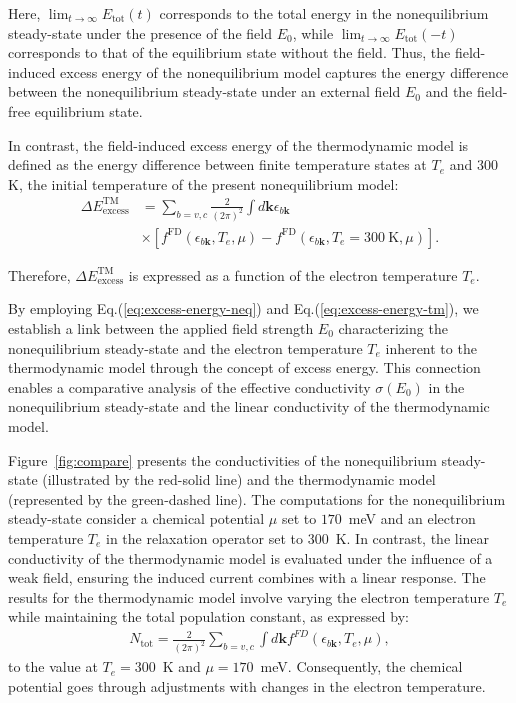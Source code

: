 Here, $\lim_{t\rightarrow \infty} E_{\mathrm{tot}}(t)$ corresponds to the total energy in the nonequilibrium steady-state under the presence of the field $E_0$, while $\lim_{t\rightarrow \infty} E_{\mathrm{tot}}(-t)$ corresponds to that of the equilibrium state without the field. Thus, the field-induced excess energy of the nonequilibrium model captures the energy difference between the nonequilibrium steady-state under an external field $E_0$ and the field-free equilibrium state.

In contrast, the field-induced excess energy of the thermodynamic model is defined as the energy difference between finite temperature states at $T_e$ and $300$K, the initial temperature of the present nonequilibrium model:
\begin{align}
	\Delta E^\mathrm{TM}_{\mathrm{excess}} & =\sum_{b=v,c}\frac{2}{(2\pi)^2}\int d\mathbf k
	\epsilon_{b\mathbf k} \nonumber                                                         \\
	                                       & \times \left [
	f^{\mathrm{FD}}\left (\epsilon_{b\mathbf k},T_e,\mu \right )
	-f^{\mathrm{FD}}\left (\epsilon_{b\mathbf k},T_e=300~\mathrm{K},\mu \right )
	\right ].
	\label{eq:excess-energy-tm}
\end{align}

Therefore, $\Delta E^\mathrm{TM}_{\mathrm{excess}}$ is expressed as a function of the electron
temperature $T_e$.

By employing Eq.(\ref{eq:excess-energy-neq}) and Eq.(\ref{eq:excess-energy-tm}), we establish a link between the applied field strength $E_0$ characterizing the nonequilibrium steady-state and the electron temperature $T_e$ inherent to the thermodynamic model through the concept of excess energy. This connection enables a comparative analysis of the effective conductivity $\sigma(E_0)$ in the nonequilibrium steady-state and the linear conductivity of the thermodynamic model.

Figure~\ref{fig:compare} presents the conductivities of the nonequilibrium steady-state (illustrated
by the red-solid line) and the thermodynamic model (represented by the green-dashed line). The
computations for the nonequilibrium steady-state consider a chemical potential $\mu$ set to
$170$~meV and an electron temperature $T_e$ in the relaxation operator set to $300$~K. In contrast,
the linear conductivity of the thermodynamic model is evaluated under the influence of a weak
field, ensuring the induced current combines with a linear response. The results for the
thermodynamic model involve varying the electron temperature $T_e$ while maintaining the total
population constant, as expressed by:
\begin{align}
	N_{\mathrm{tot}}=\frac{2}{(2\pi)^2}\sum_{b=v,c} \int d\mathbf k f^{FD}(\epsilon_{b\mathbf k},T_e,\mu),
	\label{eq:tot-pop}
\end{align}
to the value at $T_e=300$~K and $\mu=170$~meV. Consequently, the chemical potential goes through adjustments with changes in the electron temperature.

